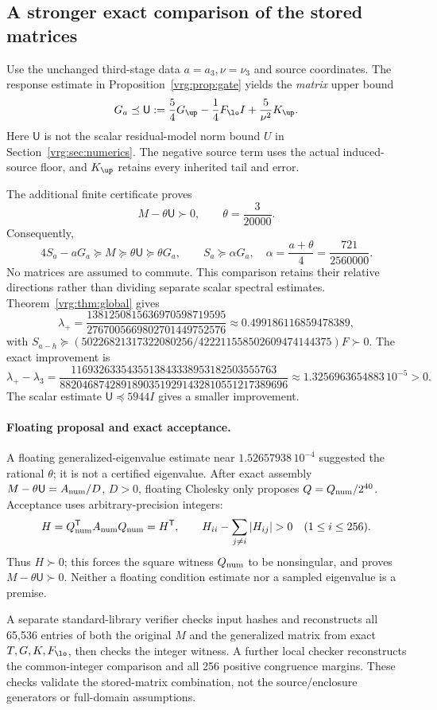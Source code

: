 \documentclass[11pt,a4paper]{article}
\numberwithin{equation}{section}
\theoremstyle{definition}\newtheorem{definition}[theorem]{Definition}
\theoremstyle{remark}\newtheorem{remark}[theorem]{Remark}
\begin{document}
\subsection{A stronger exact comparison of the stored matrices}\label{vrg:sec:generalized}
Use the unchanged third-stage data \(a=a_3,\nu=\nu_3\) and source coordinates.
The response estimate in Proposition~\ref{vrg:prop:gate} yields the \emph{matrix} upper bound
\[
G_a\preceq\mathsf U:=
 \frac54G_{\up}-\frac14F_{\lo}I+\frac5{\nu^2}K_{\up}.
\]
Here \(\mathsf U\) is not the scalar residual-model norm bound \(U\) in
Section~\ref{vrg:sec:numerics}. The negative source term uses the actual
induced-source floor, and \(K_{\up}\) retains every inherited tail and error.

The additional finite certificate proves
\[
M-\theta\mathsf U\succ0,\qquad \theta=\frac3{20000}.
\]
Consequently,
\[
4S_a-aG_a\succeq M\succeq\theta\mathsf U\succeq\theta G_a,
\qquad
S_a\succeq\alpha G_a,\quad
\alpha=\frac{a+\theta}{4}=\frac{721}{2560000}.
\]
No matrices are assumed to commute. This comparison retains their relative
directions rather than dividing separate scalar spectral estimates.
Theorem~\ref{vrg:thm:global} gives
\[
\lambda_+=\frac{1381250815636970598719595}{2767005669802701449752576}
 \approx0.499186116859478389,
\]
with \(S_{a-h}\succeq
(50226821317322080256/422211558502609474144375)F\succ0\).
The exact improvement is
\[
\lambda_+-\lambda_3=
\frac{1169326335435513843338953182503555763}
 {88204687428918903519291432810551217389696}
 \approx1.3256963654883\,10^{-5}>0.
\]
The scalar estimate \(\mathsf U\preceq5944I\) gives a smaller improvement.

\paragraph{Floating proposal and exact acceptance.}
A floating generalized-eigenvalue estimate near \(1.52657938\,10^{-4}\)
suggested the rational \(\theta\); it is not a certified eigenvalue.
After exact assembly \(M-\theta\mathsf U=A_{\rm num}/D\), \(D>0\),
floating Cholesky only proposes \(Q=Q_{\rm num}/2^{40}\).
Acceptance uses arbitrary-precision integers:
\[
H=Q_{\rm num}^{\mathsf T}A_{\rm num}Q_{\rm num}=H^{\mathsf T},
\qquad H_{ii}-\sum_{j\ne i}|H_{ij}|>0\quad(1\leq i\leq256).
\]
Thus \(H\succ0\); this forces the square witness \(Q_{\rm num}\) to be
nonsingular, and proves \(M-\theta\mathsf U\succ0\).
Neither a floating condition estimate nor a sampled eigenvalue is a premise.

A separate standard-library verifier checks input hashes and reconstructs
all 65,536 entries of both the original \(M\) and the generalized matrix
from exact \(T,G,K,F_{\lo}\), then checks the integer witness.
A further local checker reconstructs the common-integer comparison and
all 256 positive congruence margins. These checks validate the stored-matrix
combination, not the source/enclosure generators or full-domain assumptions.
\end{document}
